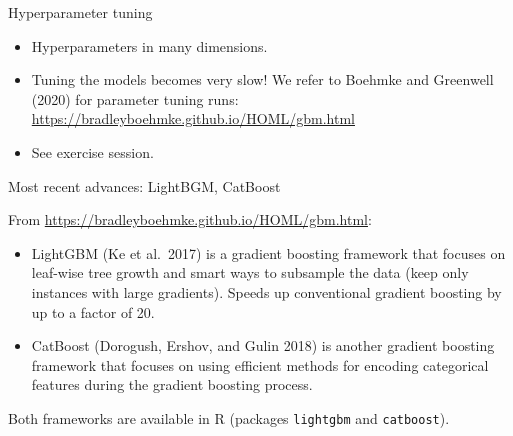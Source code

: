 \documentclass[
  10pt,
  ignorenonframetext,
]{beamer}
\providecommand{\tightlist}{%
  \setlength{\itemsep}{0pt}\setlength{\parskip}{0pt}}
\begin{document}
\begin{frame}
\begin{block}{Hyperparameter tuning}
\protect\hypertarget{hyperparameter-tuning}{}
\(~\)

\begin{itemize}
\tightlist
\item
  Hyperparameters in many dimensions.
\end{itemize}

\vspace{2mm}

\begin{itemize}
\tightlist
\item
  Tuning the models becomes very slow! We refer to Boehmke and Greenwell
  (2020) for parameter tuning runs:\\
  \url{https://bradleyboehmke.github.io/HOML/gbm.html}
\end{itemize}

\vspace{2mm}

\begin{itemize}
\tightlist
\item
  See exercise session.
\end{itemize}
\end{block}
\end{frame}

\begin{frame}[fragile]{Most recent advances: LightBGM, CatBoost}
\protect\hypertarget{most-recent-advances-lightbgm-catboost}{}
\vspace{2mm}

From \url{https://bradleyboehmke.github.io/HOML/gbm.html}:

\begin{itemize}
\item
  LightGBM (Ke et al.~2017) is a gradient boosting framework that
  focuses on leaf-wise tree growth and smart ways to subsample the data
  (keep only instances with large gradients). Speeds up conventional
  gradient boosting by up to a factor of 20.
\item
  CatBoost (Dorogush, Ershov, and Gulin 2018) is another gradient
  boosting framework that focuses on using efficient methods for
  encoding categorical features during the gradient boosting process.
\end{itemize}

\vspace{2mm}

Both frameworks are available in R (packages \texttt{lightgbm} and
\texttt{catboost}).
\end{frame}
\end{document}
